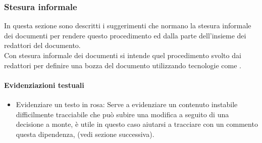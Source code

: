         \subsubsection{Stesura informale}
            In questa sezione sono descritti i suggerimenti che normano la stesura informale dei documenti per rendere questo procedimento  ed  dalla parte dell’insieme dei redattori del documento.\\
            Con stesura informale dei documenti si intende quel procedimento svolto dai redattori per definire una bozza del documento utilizzando tecnologie come .
            \paragraph{Evidenziazioni testuali}
                \begin{itemize}
                    \item\colorbox{bubblegum}{Evidenziare un testo in rosa}: Serve a evidenziare un contenuto instabile difficilmente tracciabile che può subire una modifica a seguito di una decisione a monte, è utile in questo caso aiutarsi a tracciare con un commento questa dipendenza, (vedi sezione successiva).\\
                \end{itemize}
